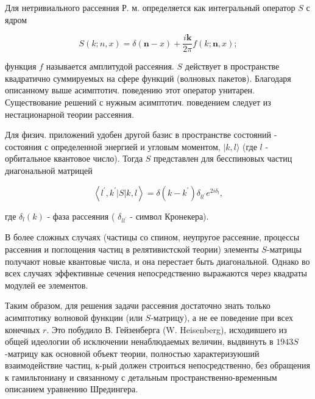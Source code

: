 \documentclass[10pt]{article}
\begin{document}
Для нетривиального рассеяния Р. м. определяется как интегральный оператор $S$ с ядром



\[

S(k ; n, x)=\delta(\boldsymbol{n}-x)+\frac{i \boldsymbol{k}}{2 \pi} f(k ; \boldsymbol{n}, x) ;

\]



функция $f$ называется амплитудой рассеяния. $S$ действует в пространстве квадратично суммируемых на сфере функций (волновых пакетов). Благодаря описанному выше асимптотич. поведению этот оператор унитарен. Существование решений с нужным асимптотич. поведением следует из нестационарной теории рассеяния.



Для физич. приложений удобен другой базис в пространстве состояний - состояния с определенной энергией и угловым моментом, $|k, l\rangle$ (где $l$ - орбитальное квантовое число). Тогда $S$ представлен для бесспиновых частиц диагональной матрицей



\[

\left\langle l^{\prime}, k^{\prime}|S| k, l\right\rangle=\delta\left(k-k^{\prime}\right) \delta_{l l^{\prime}} e^{2 i \delta_{l}},

\]



где $\delta_{l}(k)$ - фаза рассеяния ( $\delta_{l l^{\prime}}$ - символ Кронекера).



В более сложных случаях (частицы со спином, неупругое рассеяние, процессы рассеяния и поглощения частиц в релятивистской теории) элементы $S$-матрицы получают новые квантовые числа, и она перестает быть диагональной. Однако во всех случаях эффективные сечения непосредственно выражаются через квадраты модулей ее элементов.



Таким образом, для решения задачи рассеяния достаточно знать только асимптотику волновой функции (или $S$-матрицу), а не ее поведение при всех конечных $r$. Это побудило В. Гейзенберга (W. Heisenberg), исходившего из общей идеологии об исключении ненаблюдаемых величин, выдвинуть в $1943 S$-матрицу как основной объект теории, полностью характеризуюший взаимодействие частиц, к-рый должен строиться непосредственно, без обращения к гамильтониану и связанному с детальным пространственно-временным описанием уравнению Шредингера.
\end{document}
